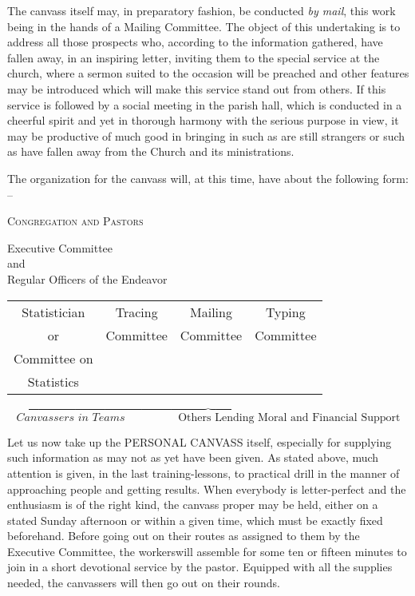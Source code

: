 \documentclass[
]{book}
\begin{document}
The canvass itself may, in preparatory fashion, be conducted \emph{by mail}, this work being in the hands of a Mailing Committee. The object of this undertaking is to address all those prospects who, according to the information gathered, have fallen away, in an inspiring letter, inviting them to the special service at the church, where a sermon suited to the occasion will be preached and other features may be introduced which will make this service stand out from others. If this service is followed by a social meeting in the parish hall, which is conducted in a cheerful spirit and yet in thorough harmony with the serious purpose in view, it may be productive of much good in bringing in such as are still strangers or such as have fallen away from the Church and its ministrations.

The organization for the canvass will, at this time, have about the following form: --

\begin{center}
\textsc{Congregation and Pastors}
\end{center}

\begin{center}
Executive Committee\\
and\\
Regular Officers of the Endeavor\\
\end{center}

\begin{center}
\begin{tabular}{c c c c}
Statistician & Tracing & Mailing & Typing\\
or & Committee & Committee & Committee\\
Committee on\\
Statistics
\end{tabular}
\end{center}

\[
 \overbrace{
  \textit{Canvassers in Teams}
  \hspace{2cm}
  \text{Others Lending Moral and Financial Support} 
 }
\]

Let us now take up the PERSONAL CANVASS itself, especially for supplying such information as may not as yet have been given. As stated above, much attention is given, in the last training-lessons, to practical drill in the manner of approaching people and getting results. When everybody is letter-perfect and the enthusiasm is of the right kind, the canvass proper may be held, either on a stated Sunday afternoon or within a given time, which must be exactly fixed beforehand. Before going out on their routes as assigned to them by the Executive Committee, the workerswill assemble for some ten or fifteen minutes to join in a short devotional service by the pastor. Equipped with all the supplies needed, the canvassers will then go out on their rounds.
\end{document}

